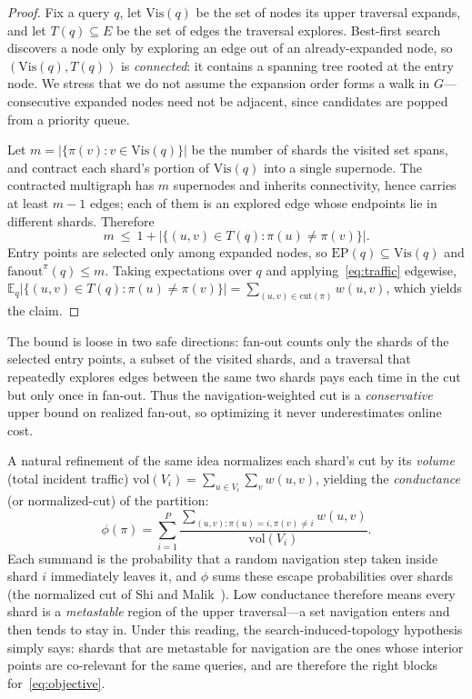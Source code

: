 \begin{proof}
Fix a query $q$, let $\mathrm{Vis}(q)$ be the set of nodes its upper traversal
expands, and let $T(q)\subseteq E$ be the set of edges the traversal explores.
Best-first search discovers a node only by exploring an edge out of an
already-expanded node, so $(\mathrm{Vis}(q),T(q))$ is \emph{connected}: it
contains a spanning tree rooted at the entry node. We stress that we do not
assume the expansion order forms a walk in $G$---consecutive expanded nodes need
not be adjacent, since candidates are popped from a priority queue.

Let $m=\bigl|\{\pi(v):v\in\mathrm{Vis}(q)\}\bigr|$ be the number of shards the
visited set spans, and contract each shard's portion of $\mathrm{Vis}(q)$ into a
single supernode. The contracted multigraph has $m$ supernodes and inherits
connectivity, hence carries at least $m-1$ edges; each of them is an explored
edge whose endpoints lie in different shards. Therefore
\[
m\ \le\ 1+\bigl|\{(u,v)\in T(q):\pi(u)\neq\pi(v)\}\bigr|.
\]
Entry points are selected only among expanded nodes, so
$\mathrm{EP}(q)\subseteq\mathrm{Vis}(q)$ and $\mathrm{fanout}^\pi(q)\le m$. Taking
expectations over $q$ and applying~\eqref{eq:traffic} edgewise,
$\mathbb{E}_q\bigl|\{(u,v)\in T(q):\pi(u)\neq\pi(v)\}\bigr|
=\sum_{(u,v)\in\mathrm{cut}(\pi)}w(u,v)$, which yields the claim.
\end{proof}

The bound is loose in two safe directions: fan-out counts only the shards of the
selected entry points, a subset of the visited shards, and a traversal that
repeatedly explores edges between the same two shards pays each time in the cut
but only once in fan-out. Thus the navigation-weighted cut is a
\emph{conservative} upper bound on realized fan-out, so optimizing it never
underestimates online cost.

A natural refinement of the same idea normalizes each shard's cut by its
\emph{volume} (total incident traffic)
$\mathrm{vol}(V_i)=\sum_{u\in V_i}\sum_{v}w(u,v)$, yielding the
\emph{conductance} (or normalized-cut) of the partition:
\[
\phi(\pi)=\sum_{i=1}^{P}\frac{\sum_{(u,v):\pi(u)=i,\pi(v)\neq i}w(u,v)}{\mathrm{vol}(V_i)}.
\]
Each summand is the probability that a random navigation step taken inside shard
$i$ immediately leaves it, and $\phi$ sums these escape probabilities over shards
(the normalized cut of Shi and Malik~\cite{shimalik2000}). Low conductance
therefore means every
shard is a \emph{metastable} region of the upper traversal---a set navigation
enters and then tends to stay in. Under this reading, the search-induced-topology hypothesis
simply says: shards that are metastable for navigation are the ones whose
interior points are co-relevant for the same queries, and are therefore the
right blocks for~\eqref{eq:objective}.

